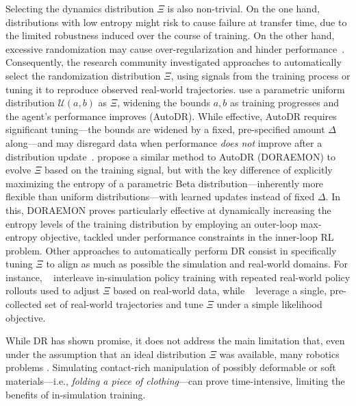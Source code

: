 Selecting the dynamics distribution \( \Xi \) is also non-trivial.
On the one hand, distributions with low entropy might risk to cause failure at transfer time, due to the limited robustness induced over the course of training.
On the other hand, excessive randomization may cause over-regularization and hinder performance~\citep{margolisRapidLocomotionReinforcement2022}.
Consequently, the research community investigated approaches to automatically select the randomization distribution \( \Xi \), using signals from the training process or tuning it to reproduce observed real-world trajectories.
\citet{akkayaSolvingRubiksCube2019} use a parametric uniform distribution \( \mathcal U(a, b) \) as \( \Xi \), widening the bounds \( a, b \) as training progresses and the agent's performance improves (AutoDR).
While effective, AutoDR requires significant tuning---the bounds are widened by a fixed, pre-specified amount \( \Delta \) along---and may disregard data when performance \emph{does not} improve after a distribution update~\citep{tiboniDomainRandomizationEntropy2024}. \citet{tiboniDomainRandomizationEntropy2024} propose a similar method to AutoDR (DORAEMON) to evolve \( \Xi \) based on the training signal, but with the key difference of explicitly maximizing the entropy of a parametric Beta distribution---inherently more flexible than uniform distributions---with learned updates instead of fixed \( \Delta \).
In this, DORAEMON proves particularly effective at dynamically increasing the entropy levels of the training distribution by employing an outer-loop max-entropy objective, tackled under performance constraints in the inner-loop RL problem.
Other approaches to automatically perform DR consist in specifically tuning \( \Xi \) to align as much as possible the simulation and real-world domains.
For instance, ~\citet{chebotar2019closing} interleave in-simulation policy training with repeated real-world policy rollouts used to adjust \( \Xi \) based on real-world data, while ~\citet{tiboniDROPOSimtoRealTransfer2023} leverage a single, pre-collected set of real-world trajectories and tune \( \Xi \) under a simple likelihood objective.

While DR has shown promise, it does not address the main limitation that, even under the assumption that an ideal distribution \( \Xi \) was available, many robotics problems .
Simulating contact-rich manipulation of possibly deformable or soft materials---i.e., \emph{folding a piece of clothing}---can prove time-intensive, limiting the benefits of in-simulation training.


